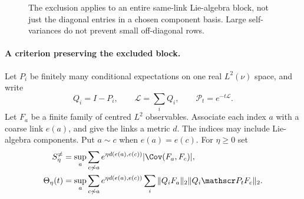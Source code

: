 \begin{figure}[tb]
\centering
{}
\caption{The exclusion applies to an entire same-link Lie-algebra block,
not just the diagonal entries in a chosen component basis. Large
self-variances do not prevent small off-diagonal rows.}
\label{fig:r42off}
\end{figure}

\paragraph{A criterion preserving the excluded block.}
Let $P_i$ be finitely many conditional expectations on one real
$L^2(\nu)$ space, and write
\[
 Q_i=I-P_i,\qquad \mathscr L=\sum_iQ_i,\qquad
 \mathscr P_t=e^{-t\mathscr L}.
\]
Let $F_a$ be a finite family of centred $L^2$ observables. Associate each
index $a$ with a coarse link $e(a)$, and give the links a metric $d$.
The indices may include Lie-algebra components. Put $a\sim c$ when
$e(a)=e(c)$. For $\eta\ge0$ set
\begin{align}
 S_\eta^{\ne}&=\sup_a\sum_{c\not\sim a}
   e^{\eta d(e(a),e(c))}|\Cov(F_a,F_c)|,\label{eq:r42soff}\\
 \Theta_\eta(t)&=\sup_a\sum_{c\not\sim a}
   e^{\eta d(e(a),e(c))}
   \sum_i\|Q_iF_a\|_2\|Q_i\mathscr P_tF_c\|_2.
   \label{eq:r42theta}
\end{align}


